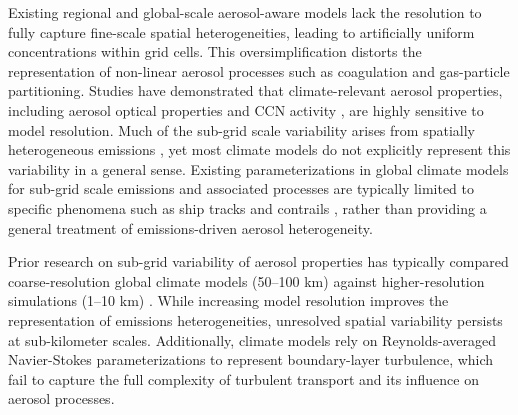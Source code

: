 \documentclass[acp]{copernicus}
\begin{document}
Existing regional and global-scale aerosol-aware models lack the
resolution to fully capture fine-scale spatial heterogeneities,
leading to artificially uniform concentrations within grid cells. This
oversimplification distorts the representation of non-linear aerosol
processes such as coagulation and gas-particle partitioning. Studies
have demonstrated that climate-relevant aerosol properties, including
aerosol optical properties \citep{gustafson_jr_downscaling_2011} and
CCN activity \citep{weigum_effect_2016}, are highly sensitive to model
resolution. Much of the sub-grid scale variability arises from
spatially heterogeneous emissions \citep{qian_investigation_2010}, yet most climate models do not explicitly represent this variability in a general sense. Existing parameterizations in global climate models for sub-grid scale emissions and associated processes are typically limited to specific phenomena such as ship tracks \citep{huszar_modeling_2010} and contrails \citep{burkhardt_processbased_2009}, rather than providing a general treatment of emissions-driven aerosol heterogeneity.


Prior research on sub-grid variability of aerosol properties has
typically compared coarse-resolution global climate models (50--100 km)
against higher-resolution simulations (1--10 km)
\citep{qian_investigation_2010, gustafson_jr_downscaling_2011,
  weigum_effect_2016, crippa_impact_2017,
  lin_quantification_2017}. While increasing model resolution improves
the representation of emissions heterogeneities, unresolved spatial
variability persists at sub-kilometer scales. Additionally,
climate models rely on Reynolds-averaged Navier-Stokes
parameterizations to represent boundary-layer turbulence, which fail
to capture the full complexity of turbulent transport and its
influence on aerosol processes.
\end{document}
